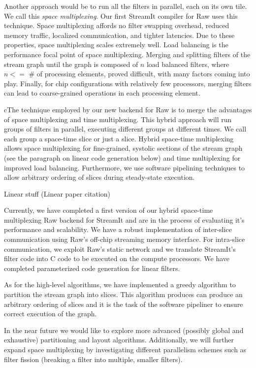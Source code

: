 \documentclass{csailabstractbook}
\begin{document}
Another approach would be to run all the filters in parallel, each on
its own tile.  We call this {\it space multiplexing}.  Our first 
StreamIt compiler for Raw uses this technique.  Space multiplexing
affords no filter swapping overhead, reduced memory traffic,
localized communication, and tighter latencies.  Due to these
properties, space multiplexing scales extremely well.  
Load balancing is the performance focal point of space multiplexing.  Merging
and splitting filters of the stream graph until the graph is composed
of $n$ load balanced filters, where $n <=$ \# of processing
elements, proved difficult, with many factors coming into play.  
Finally, for chip configurations with relatively few processors, merging filters
can lead to coarse-grained operations in each processing element. 

cThe technique employed by our new backend for Raw is to merge the
advantages of space multiplexing and time multiplexing.  This hybrid
approach will run groups of filters in parallel, executing different
groups at different times.  We call each group a space-time slice or
just a slice.  Hybrid space-time multiplexing allows space
multiplexing for fine-grained, systolic sections of the stream graph
(see the paragraph on linear code generation below) and time
multiplexing for improved load balancing.  Furthermore, we use
software pipelining techniques to allow arbitrary ordering of slices
during steady-state execution.



Linear stuff (Linear paper citation)
 
Currently, we have completed a first version of our hybrid space-time
multiplexing Raw backend for StreamIt and are in the process of
evaluating it's performance and scalability.  We have a robust
implementation of inter-slice communication using Raw's off-chip
streaming memory interface.  For intra-slice communication, we exploit
Raw's static network and we translate StreamIt's filter code into C
code to be executed on the compute processors.  We have completed
parameterized code generation for linear filters.   

As for the high-level algorithms, we have implemented a greedy
algorithm to partition the stream graph into slices.  This algorithm
produces can produce an arbitrary ordering of slices and it is the
task of the software pipeliner to ensure correct execution of the
graph. 

In the near future we would like to explore more advanced (possibly global
and exhaustive) partitioning and layout algorithms.  Additionally, we
will further expand space multiplexing by investigating
different parallelism schemes such as filter fission (breaking a
filter into multiple, smaller filters). 
\end{document}
